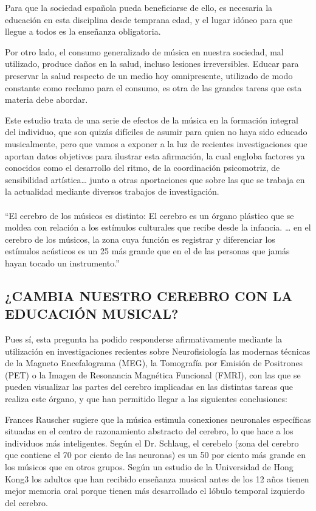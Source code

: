 \documentclass{bmcart}
\begin{document}
Para que la sociedad española pueda beneficiarse de ello, es  necesaria la educación en esta disciplina desde temprana edad, y el lugar idóneo para que llegue a todos es la enseñanza obligatoria.

Por otro lado, el consumo generalizado de música en nuestra sociedad, mal utilizado, produce daños en la salud, incluso lesiones irreversibles. Educar para preservar la salud respecto de un medio hoy omnipresente, utilizado de modo constante como reclamo para el consumo, es otra de las grandes tareas que esta materia debe abordar.

Este estudio trata de una serie de efectos de la música en la formación integral del individuo, que son quizás difíciles de asumir para quien no haya sido educado musicalmente, pero que vamos a exponer a la luz de recientes investigaciones que aportan datos objetivos para ilustrar esta afirmación, la cual engloba factores ya conocidos como el desarrollo del ritmo, de la coordinación psicomotriz, de  sensibilidad artística… junto a otras aportaciones que sobre las que se trabaja en la actualidad mediante diversos trabajos de investigación.
\paragraph*{ }
“El cerebro de los músicos es distinto: El cerebro es un órgano plástico que se moldea con relación a los estímulos culturales que recibe desde la infancia. … en el cerebro de los músicos, la zona cuya función es registrar y diferenciar los estímulos acústicos es un 25 más grande que en el de las personas que jamás hayan tocado un instrumento.”

\subsection*{¿CAMBIA NUESTRO CEREBRO CON LA EDUCACIÓN MUSICAL?}
Pues sí, esta pregunta ha podido responderse afirmativamente mediante la utilización en investigaciones recientes sobre Neurofisiología las modernas técnicas de la Magneto Encefalograma (MEG), la Tomografía por Emisión de Positrones (PET) o la
Imagen de Resonancia Magnética Funcional (FMRI), con las que se pueden visualizar las partes del cerebro implicadas en las distintas tareas que realiza este órgano, y que han permitido llegar a las siguientes conclusiones:

Frances Rauscher sugiere que la música estimula conexiones neuronales específicas situadas en el centro de razonamiento abstracto del cerebro, lo que hace a los individuos más inteligentes.
Según el Dr. Schlaug, el cerebelo (zona del cerebro que contiene el 70 por ciento de las neuronas) es un 50 por ciento más grande en los músicos que en otros grupos.
Según un estudio de la Universidad de Hong Kong3 los adultos que han recibido enseñanza musical antes de los 12 años tienen mejor memoria oral porque tienen más desarrollado el lóbulo temporal izquierdo del cerebro.
\end{document}
